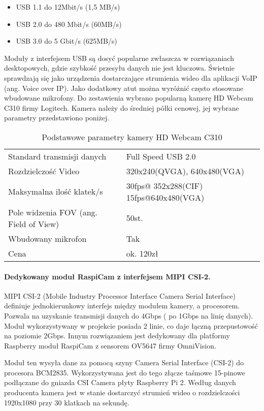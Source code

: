 \begin{itemize}[noitemsep]
\item USB 1.1 do 12Mbit/s (1,5 MB/s)
\item USB 2.0 do 480 Mbit/s (60MB/s)
\item USB 3.0 do 5 Gbit/s (625MB/s)
\end{itemize}

Moduły z interfejsem USB są dosyć popularne zwłaszcza w rozwiązaniach desktopowych, gdzie szybkość przesyłu danych nie jest kluczowa. Świetnie sprawdzają się jako urządzenia dostarczające strumienia wideo dla aplikacji VoIP (ang. Voice over IP). Jako dodatkowy atut można wyróżnić często stosowane wbudowane mikrofony.
Do zestawienia wybrano popularną kamerę  HD Webcam C310 firmy Logitech. Kamera należy do średniej półki cenowej, jej wybrane parametry przedstawiono poniżej.


\begin{table}[hbt!]
\caption[Podstawowe parametry kamery HD Webcam C310]{Podstawowe parametry kamery HD Webcam C310}
\begin{tabularx}{\textwidth}{|l|X|} 
 \hline
Standard transmisji danych &	Full Speed USB 2.0 \\
Rozdzielczość Video &	320x240(QVGA), 640x480(VGA) \\
Maksymalna ilość klatek/s &	30fps@ 352x288(CIF) 15fps@640x480(VGA) \\
Pole widzenia FOV (ang. Field of View) &	50st. \\
Wbudowany mikrofon &	Tak\\
Cena &	ok. 120zł\\
\hline
\end{tabularx}  
\label{tab:compareAnalysers}
\end{table}


\paragraph{ Dedykowany moduł RaspiCam z interfejsem MIPI CSI-2. } MIPI CSI-2 (Mobile Industry Processor Interface Camera Serial Interface) definiuje jednokierunkowy interfejs między modułem kamery, a procesorem. Pozwala na uzyskanie transmisji danych do 4Gbps ( po 1Gbps na linię danych). Moduł wykorzystywany w projekcie posiada 2 linie, co daje łączną przepustowość na poziomie 2Gbps.
Innym rozwiązaniem jest dedykowany dla platformy Raspberry moduł RaspiCam z  sensorem  OV5647 firmy OmniVision. 

Moduł ten wysyła dane za pomocą szyny Camera Serial Interface (CSI-2) do procesora BCM2835. Wykorzystywana jest do tego złącze taśmowe 15-pinowe podłączane do gniazda CSI Camera płyty Raspberry Pi 2. Według danych producenta kamera jest w stanie dostarczyć strumień wideo o rozdzielczości 1920x1080 przy 30 klatkach na sekundę.

